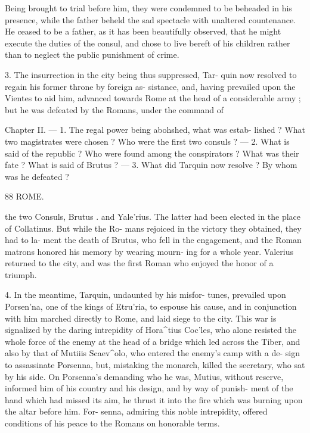 \documentclass[openany,a4paper]{memoir}
\begin{document}
{Being brought to trial before him, they were condemned 
to be beheaded in his presence, while the father beheld the 
sad spectacle with unaltered countenance. He ceased to be 
a father, as it has been beautifully observed, that he might 
execute the duties of the consul, and chose to live bereft of 
his children rather than to neglect the public punishment of 
crime. 

3. The insurrection in the city being thus suppressed, Tar- 
quin now resolved to regain his former throne by foreign as- 
sistance, and, having prevailed upon the Vientes to aid him, 
advanced towards Rome at the head of a considerable army ; 
but he was defeated by the Romans, under the command of 

Chapter II. — 1. The regal power being abohshed, what was estab- 
lished ? What two magistrates were chosen ? Who were the first two 
consuls ? — 2. What is said of the republic ? Who were found among the 
conspirators ? What was their fate ? What is said of Brutus ? — 3. What 
did Tarquin now resolve ? By whom was he defeated ? 



88 ROME. 

the two Consuls, Brutus . and Yale'rius. The latter had 
been elected in the place of Collatinus. But while the Ro- 
mans rejoiced in the victory they obtained, they had to la- 
ment the death of Brutus, who fell in the engagement, and 
the Roman matrons honored his memory by wearing mourn- 
ing for a whole year. Valerius returned to the city, and 
was the first Roman who enjoyed the honor of a triumph. 

4. In the meantime, Tarquin, undaunted by his misfor- 
tunes, prevailed upon Porsen'na, one of the kings of Etru'ria, 
to espouse his cause, and in conjunction with him marched 
directly to Rome, and laid siege to the city. This war is 
signalized by the daring intrepidity of Hora^tius Coc'les, 
who alone resisted the whole force of the enemy at the head 
of a bridge which led across the Tiber, and also by that of 
Mutiiis Scaev^olo, who entered the enemy's camp with a de- 
sign to assassinate Porsenna, but, mistaking the monarch, 
killed the secretary, who sat by his side. On Porsenna's 
demanding who he was, Mutius, without reserve, informed 
him of his country and his design, and by way of punish- 
ment of the hand which had missed its aim, he thrust it into 
the fire which was burning upon the altar before him. For- 
senna, admiring this noble intrepidity, offered conditions of 
his peace to the Romans on honorable terms. 

}
\end{document}
